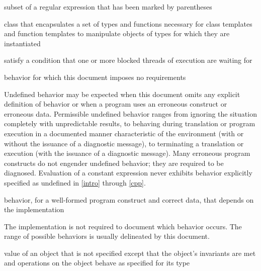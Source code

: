 %
subset of a regular expression that has
been marked by parentheses

%
class that encapsulates a set of types and functions necessary for class templates and
function templates to manipulate objects of types for which they are instantiated

%
satisfy a condition that one or more blocked threads of execution are waiting for

%
behavior for which this document
imposes no requirements

\begin{defnote}
Undefined behavior may be expected when
this document omits any explicit
definition of behavior or when a program uses an erroneous construct or erroneous data.
Permissible undefined behavior ranges
from ignoring the situation completely with unpredictable results, to
behaving during translation or program execution in a documented manner
characteristic of the environment (with or without the issuance of a
diagnostic message), to terminating a translation or execution (with the
issuance of a diagnostic message). Many erroneous program constructs do
not engender undefined behavior; they are required to be diagnosed.
Evaluation of a constant expression never exhibits behavior explicitly
specified as undefined in \ref{intro} through \ref{cpp}.
\end{defnote}

%
behavior, for a well-formed program construct and correct data, that
depends on the implementation

\begin{defnote}
The implementation is not required to
document which behavior occurs. The range of
possible behaviors is usually delineated by this document.
\end{defnote}

%
value of an object that is not specified except that the object's invariants are
met and operations on the object behave as specified for its type

